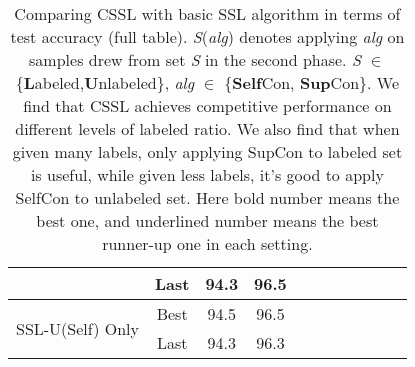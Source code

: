 \documentclass[letterpaper]{article} \usepackage{aaai22}  \usepackage{times}  \usepackage{helvet}  \usepackage{courier}  \usepackage[hyphens]{url}  \usepackage{graphicx} \usepackage{subfigure}
\begin{document}
\begin{table}[h]
\begin{center}
\begin{tabular}{lcccccccccc}
& Last & 94.3 & 96.5 \\
\hline
\multirow{2}{*}{SSL-U(Self) Only} & Best & 94.5 & 96.5 \\
& Last & 94.3 & 96.3 \\
\hline
\end{tabular}
\end{center}
\caption{Comparing CSSL with basic SSL algorithm in terms of test accuracy (full table). \textit{S}(\textit{alg}) denotes applying \textit{alg} on samples drew from set \textit{S} in the second phase. \textit{S} $\in$\{\textbf{L}abeled,\textbf{U}nlabeled\}, \textit{alg} $\in$ \{\textbf{Self}Con, \textbf{Sup}Con\}. We find that CSSL achieves competitive performance on different levels of labeled ratio. We also find that when given many labels, only applying SupCon to labeled set is useful, while given less labels, it's good to apply SelfCon to unlabeled set. Here bold number means the best one, and underlined number means the best runner-up one in each setting. }
\label{tab:table1_complete}
\end{table}
\end{document}
